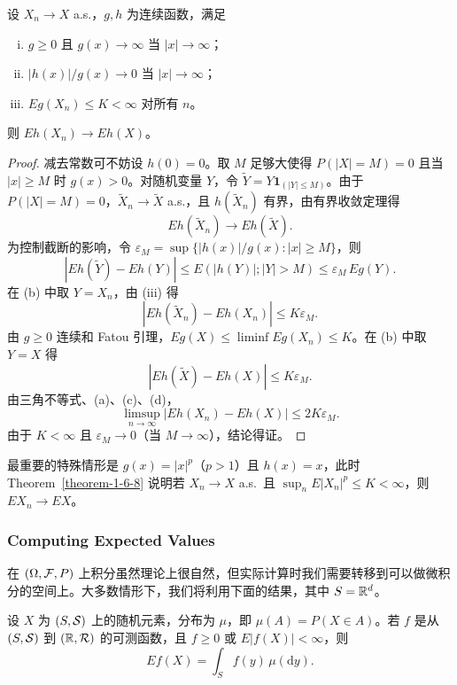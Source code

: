 \begin{theorem}\label{theorem-1-6-8}
    设 $X_n \to X$ a.s.，$g, h$ 为连续函数，满足
    \begin{enumerate}[(i)]
        \item $g \ge 0$ 且 $g(x) \to \infty$ 当 $|x| \to \infty$；
        \item $|h(x)|/g(x) \to 0$ 当 $|x| \to \infty$；
        \item $Eg(X_n) \le K < \infty$ 对所有 $n$。
    \end{enumerate}
    则 $Eh(X_n) \to Eh(X)$。
\end{theorem}

\begin{proof}
    减去常数可不妨设 $h(0) = 0$。取 $M$ 足够大使得 $P(|X| = M) = 0$ 且当 $|x| \ge M$ 时 $g(x) > 0$。对随机变量 $Y$，令 $\tilde{Y} = Y \mathbf{1}_{(|Y| \le M)}$。由于 $P(|X| = M) = 0$，$\tilde{X}_n \to \tilde{X}$ a.s.，且 $h(\tilde{X}_n)$ 有界，由有界收敛定理得
    \[
        Eh(\tilde{X}_n) \to Eh(\tilde{X}). \tag{a}
    \]
    为控制截断的影响，令 $\varepsilon_M = \sup\{|h(x)|/g(x) : |x| \ge M\}$，则
    \[
        |Eh(\tilde{Y}) - Eh(Y)| \le E(|h(Y)|; |Y| > M) \le \varepsilon_M \, Eg(Y). \tag{b}
    \]
    在 (b) 中取 $Y = X_n$，由 (iii) 得
    \[
        |Eh(\tilde{X}_n) - Eh(X_n)| \le K\varepsilon_M. \tag{c}
    \]
    由 $g \ge 0$ 连续和 Fatou 引理，$Eg(X) \le \liminf Eg(X_n) \le K$。在 (b) 中取 $Y = X$ 得
    \[
        |Eh(\tilde{X}) - Eh(X)| \le K\varepsilon_M. \tag{d}
    \]
    由三角不等式、(a)、(c)、(d)，
    \[
        \limsup_{n \to \infty} |Eh(X_n) - Eh(X)| \le 2K\varepsilon_M.
    \]
    由于 $K < \infty$ 且 $\varepsilon_M \to 0$（当 $M \to \infty$），结论得证。
\end{proof}

最重要的特殊情形是 $g(x) = |x|^p$（$p > 1$）且 $h(x) = x$，此时 Theorem~\ref{theorem-1-6-8} 说明若 $X_n \to X$ a.s.\ 且 $\sup_n E|X_n|^p \le K < \infty$，则 $EX_n \to EX$。

\subsubsection{Computing Expected Values}

在 $(\Omega, \mathcal{F}, P)$ 上积分虽然理论上很自然，但实际计算时我们需要转移到可以做微积分的空间上。大多数情形下，我们将利用下面的结果，其中 $S = \mathbb{R}^d$。

\begin{theorem}\label{theorem-1-6-9}
    设 $X$ 为 $(S, \mathcal{S})$ 上的随机元素，分布为 $\mu$，即 $\mu(A) = P(X \in A)$。若 $f$ 是从 $(S, \mathcal{S})$ 到 $(\mathbb{R}, \mathcal{R})$ 的可测函数，且 $f \ge 0$ 或 $E|f(X)| < \infty$，则
    \[
        Ef(X) = \int_S f(y) \, \mu(\mathrm{d}y).
    \]
\end{theorem}

